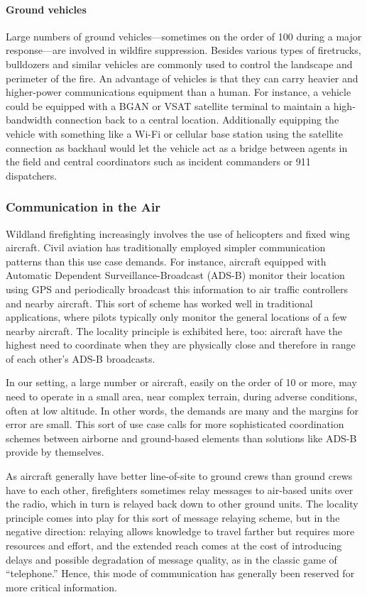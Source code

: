 \documentclass[]             %
{NASA}                       %
\theoremstyle{definition}
\begin{document}
\paragraph{Ground vehicles}
Large numbers of ground vehicles---sometimes on the order of 100
during a major response---are involved in wildfire
suppression. Besides various types of firetrucks, bulldozers and
similar vehicles are commonly used to control the landscape and
perimeter of the fire. An advantage of vehicles is that they can carry
heavier and higher-power communications equipment than a human. For
instance, a vehicle could be equipped with a BGAN or VSAT satellite
terminal to maintain a high-bandwidth connection back to a central
location. Additionally equipping the vehicle with something like a
Wi-Fi or cellular base station using the satellite connection as
backhaul would let the vehicle act as a bridge between agents in the
field and central coordinators such as incident commanders or 911
dispatchers.

\subsubsection{Communication in the Air}
Wildland firefighting increasingly involves the use of helicopters and
fixed wing aircraft. Civil aviation has traditionally employed simpler
communication patterns than this use case demands. For instance,
aircraft equipped with Automatic Dependent Surveillance-Broadcast
(ADS-B) monitor their location using GPS and periodically broadcast
this information to air traffic controllers and nearby aircraft. This
sort of scheme has worked well in traditional applications, where
pilots typically only monitor the general locations of a few nearby
aircraft. The locality principle is exhibited here, too: aircraft have
the highest need to coordinate when they are physically close and
therefore in range of each other's ADS-B broadcasts.

In our setting, a large number or aircraft, easily on the order of 10 or
more, may need to operate in a small area, near complex terrain,
during adverse conditions, often at low altitude. In other words, the
demands are many and the margins for error are small. This sort of use
case calls for more sophisticated coordination schemes between
airborne and ground-based elements than solutions like ADS-B provide
by themselves.

As aircraft generally have better line-of-site to ground crews than
ground crews have to each other, firefighters sometimes relay messages
to air-based units over the radio, which in turn is relayed back down
to other ground units. The locality principle comes into play for this
sort of message relaying scheme, but in the negative direction:
relaying allows knowledge to travel farther but requires more resources and effort,
and the extended reach comes at the cost of introducing delays and
possible degradation of message quality, as in the classic game of
``telephone.'' Hence, this mode of communication has generally been reserved for
more critical information.
\end{document}

